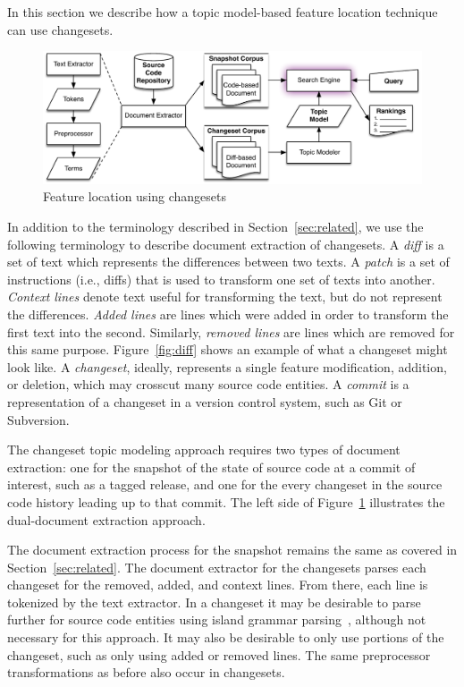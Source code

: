In this section we describe how a topic model-based feature location
technique can use changesets.



\begin{figure}
\vspace{2mm}
\centerline{\includegraphics[width=.75\textwidth]{figures/changeset-flt}}
\caption{Feature location using changesets}
\label{fig:changeset}
\vspace{-2mm}
\end{figure}

In addition to the terminology described in Section~\ref{sec:related},
we use the following terminology to describe document extraction of changesets.
A \textit{diff} is a set of text which represents the differences between two texts.
A \textit{patch} is a set of instructions (i.e., diffs) that is used to transform one set of texts into another.
\textit{Context lines} denote text useful for transforming the text, but do not represent the differences.
\textit{Added lines} are lines which were added in order to transform the first text into the second.
Similarly, \textit{removed lines} are lines which are removed for this same purpose.
Figure~\ref{fig:diff} shows an example of what a changeset might look like.
A \textit{changeset}, ideally, represents a single feature modification,
addition, or deletion, which may crosscut many source code entities.
A \textit{commit} is a representation of a changeset in a version control system, such as Git or Subversion.

The changeset topic modeling approach requires two types of document extraction:
one for the snapshot of the state of source code at a commit of interest, such as a tagged release,
and one for the every changeset in the source code history leading up to that commit.
The left side of Figure~\ref{fig:changeset} illustrates the dual-document extraction approach.

The document extraction process for the snapshot remains the same as covered in Section~\ref{sec:related}.
The document extractor for the changesets parses each changeset for the removed, added, and context lines.
From there, each line is tokenized by the text extractor.
In a changeset it may be desirable to parse further for source code entities using island grammar parsing~\cite{Moonen:2001},
although not necessary for this approach.
It may also be desirable to only use portions of the changeset, such as only using added or removed lines.
The same preprocessor transformations as before also occur in changesets.

